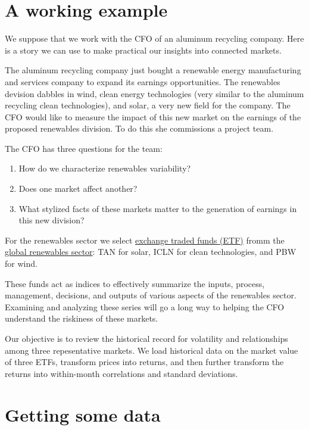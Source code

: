 \documentclass{article}
\begin{document}
\hypertarget{a-working-example}{%
\section{A working example}\label{a-working-example}}

We suppose that we work with the CFO of an aluminum recycling company.
Here is a story we can use to make practical our insights into connected
markets.

The aluminum recycling company just bought a renewable energy
manufacturing and services company to expand its earnings opportunities.
The renewables devision dabbles in wind, clean energy technologies (very
similar to the aluminum recycling clean technologies), and solar, a very
new field for the company. The CFO would like to measure the impact of
this new market on the earnings of the proposed renewables division. To
do this she commissions a project team.

The CFO has three questions for the team:

\begin{enumerate}
\def\labelenumi{\arabic{enumi}.}
\item
  How do we characterize renewables variability?
\item
  Does one market affect another?
\item
  What stylized facts of these markets matter to the generation of
  earnings in this new division?
\end{enumerate}

For the renewables sector we select
\href{https://www.investopedia.com/terms/e/etf.asp}{exchange traded
funds (ETF)} fromm the
\href{https://www.etf.com/channels/renewable-energy-etfs}{global
renewables sector}: TAN for solar, ICLN for clean technologies, and PBW
for wind.

These funds act as indices to effectively summarize the inputs, process,
management, decisions, and outputs of various aspects of the renewables
sector. Examining and analyzing these series will go a long way to
helping the CFO understand the riskiness of these markets.

Our objective is to review the historical record for volatility and
relationships among three repesentative markets. We load historical data
on the market value of three ETFs, transform prices into returns, and
then further transform the returns into within-month correlations and
standard deviations.

\hypertarget{getting-some-data}{%
\section{Getting some data}\label{getting-some-data}}
\end{document}
